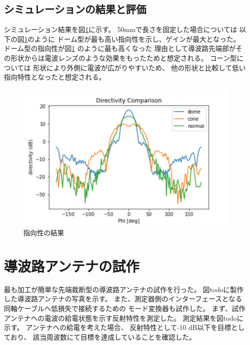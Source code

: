 \documentclass[technicalreport]{ieicej}
\begin{document}
\subsection{シミュレーションの結果と評価}

シミュレーション結果を図\ref{fig:directivity_results}に示す。
50mmで長さを固定した場合については
以下の図\ref{fig:directivity_results}のように
ドーム型が最も高い指向性を示し、ゲインが最大となった。
ドーム型の指向性が図\ref{fig:directivity_results} のように最も高くなった
理由として導波路先端部がその形状からは電波レンズのような効果をもったためと想定される。
コーン型については
形状により外側に電波が広がりやすいため、
他の形状と比較して低い指向特性となったと想定される。

\begin{figure}[tb]
  \begin{center}
    \includegraphics[bb=0.000000 0.000000 432.098422 288.065615, width=1.0\linewidth]{img/directivity_comparison.pdf}
    \caption{指向性の結果}
    \label{fig:directivity_results}
  \end{center}
\end{figure}

\section{導波路アンテナの試作}

最も加工が簡単な先端裁断型の導波路アンテナの試作を行った。
図todoに製作した導波路アンテナの写真を示す。
また、測定器側のインターフェースとなる同軸ケーブルへ低損失で接続するための
モード変換器も試作した。
まず、試作アンテナへの電波の給電状態を示す反射特性を測定した。
測定結果を図todoに示す。
アンテナへの給電を考えた場合、
反射特性として-10 dB以下を目標としており、
該当周波数にて目標を達成していることを確認した。
\end{document}
